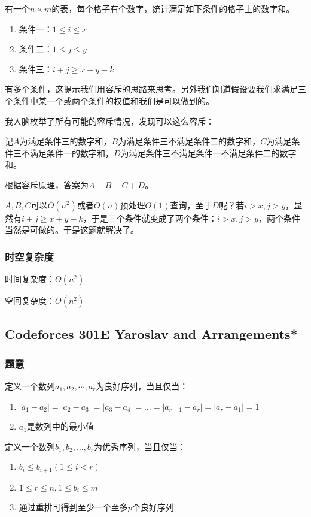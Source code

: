 \documentclass{ctexart}
\begin{document}
有一个$n \times m$的表，每个格子有个数字，统计满足如下条件的格子上的数字和。
\begin{enumerate}
\item 条件一：$1 \le i \le x$
\item 条件二：$1 \le j \le y$
\item 条件三：$i+j \ge x+y-k$
\end{enumerate}

有多个条件，这提示我们用容斥的思路来思考。另外我们知道假设要我们求满足三个条件中某一个或两个条件的权值和我们是可以做到的。

我人脑枚举了所有可能的容斥情况，发现可以这么容斥：

记$A$为满足条件三的数字和，$B$为满足条件三不满足条件二的数字和，$C$为满足条件三不满足条件一的数字和，$D$为满足条件三不满足条件一不满足条件二的数字和。

根据容斥原理，答案为$A-B-C+D$。

$A,B,C$可以$O(n^2)$或者$O(n)$预处理$O(1)$查询，至于$D$呢？若$i>x,j>y$，显然有$i+j \ge x+y-k$，于是三个条件就变成了两个条件：$i>x,j>y$，两个条件当然是可做的。于是这题就解决了。
\subsubsection{时空复杂度}
时间复杂度：$O(n^2)$

空间复杂度：$O(n^2)$
\subsection{Codeforces 301E Yaroslav and Arrangements*}
\subsubsection{题意}
定义一个数列$a_1,a_2,\cdots,a_r$为良好序列，当且仅当：
\begin{enumerate}
\item $|a_1-a_2|=|a_2-a_3|=|a_3-a_4|=\ldots=|a_{r-1}-a_r|=|a_r-a_1|=1$
\item $a_1$是数列中的最小值
\end{enumerate}

定义一个数列$b_1,b_2,\ldots,b_r$为优秀序列，当且仅当：
\begin{enumerate}
\item $b_i \le b_{i+1}(1 \le i < r)$
\item $1 \le r \le n,1 \le b_i \le m$
\item 通过重排可得到至少一个至多$p$个良好序列
\end{enumerate}
\end{document}
